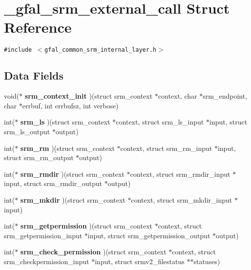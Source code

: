 \section{\_\-gfal\_\-srm\_\-external\_\-call Struct Reference}
\label{struct__gfal__srm__external__call}
{\tt \#include $<$gfal\_\-common\_\-srm\_\-internal\_\-layer.h$>$}

\subsection*{Data Fields}
\begin{CompactItemize}
\item 
void($\ast$ \textbf{srm\_\-context\_\-init} )(struct srm\_\-context $\ast$context, char $\ast$srm\_\-endpoint, char $\ast$errbuf, int errbufsz, int verbose)\label{struct__gfal__srm__external__call_c8feab1503dbbb4d457c5c008bf19c0c}

\item 
int($\ast$ \textbf{srm\_\-ls} )(struct srm\_\-context $\ast$context, struct srm\_\-ls\_\-input $\ast$input, struct srm\_\-ls\_\-output $\ast$output)\label{struct__gfal__srm__external__call_81ed6c9c2f289df212f857321e7e39d6}

\item 
int($\ast$ \textbf{srm\_\-rm} )(struct srm\_\-context $\ast$context, struct srm\_\-rm\_\-input $\ast$input, struct srm\_\-rm\_\-output $\ast$output)\label{struct__gfal__srm__external__call_3cdc8216acbcbf271f5f3822659d977c}

\item 
int($\ast$ \textbf{srm\_\-rmdir} )(struct srm\_\-context $\ast$context, struct srm\_\-rmdir\_\-input $\ast$input, struct srm\_\-rmdir\_\-output $\ast$output)\label{struct__gfal__srm__external__call_26679171bd7306372dc4996881041f06}

\item 
int($\ast$ \textbf{srm\_\-mkdir} )(struct srm\_\-context $\ast$context, struct srm\_\-mkdir\_\-input $\ast$input)\label{struct__gfal__srm__external__call_7f69b2ce5e4c48d4c139f83173bc1141}

\item 
int($\ast$ \textbf{srm\_\-getpermission} )(struct srm\_\-context $\ast$context, struct srm\_\-getpermission\_\-input $\ast$input, struct srm\_\-getpermission\_\-output $\ast$output)\label{struct__gfal__srm__external__call_5d9566c51ae7e37e339dab73a6da8593}

\item 
int($\ast$ \textbf{srm\_\-check\_\-permission} )(struct srm\_\-context $\ast$context, struct srm\_\-checkpermission\_\-input $\ast$input, struct srmv2\_\-filestatus $\ast$$\ast$statuses)\label{struct__gfal__srm__external__call_2ace1e445ffd7f345b8b824d7a291873}


\end{CompactItemize}
